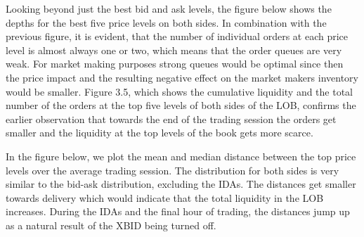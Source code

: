 \documentclass[12pt,a4paper]{cau_thesis}
\begin{document}
Looking beyond just the best bid and ask levels, the figure below
shows the depths for the best five price levels on both sides. In
combination with the previous figure, it is evident, that the number
of individual orders at each price level is almost always one or two,
which means that the order queues are very weak. For market making
purposes strong queues would be optimal since then the price impact
and the resulting negative effect on the market makers inventory
would be smaller. Figure 3.5, which shows the cumulative liquidity
and the total number of the orders at the top five levels of both
sides of the LOB, confirms the earlier observation that towards the
end of the trading session the orders get smaller and the liquidity
at the top levels of the book gets more scarce.
\begin{figure}[htbp]
    \vspace*{0.5cm}
    \centering
    \label{fig:lob_depth_top5_levels}
\end{figure}
In the figure below, we plot the mean and median distance between the
top price levels over the average trading session. The distribution
for both sides is very similar to the bid-ask distribution, excluding
the IDAs. The distances get smaller towards delivery which would
indicate that the total liquidity in the LOB increases. During the
IDAs and the final hour of trading, the distances jump up as a
natural result of the XBID being turned off.
\begin{figure}[htbp]
    \vspace*{0.5cm}
    \centering
    \label{fig:mean_median_dist_5_price_levels}
\end{figure}
\end{document}
